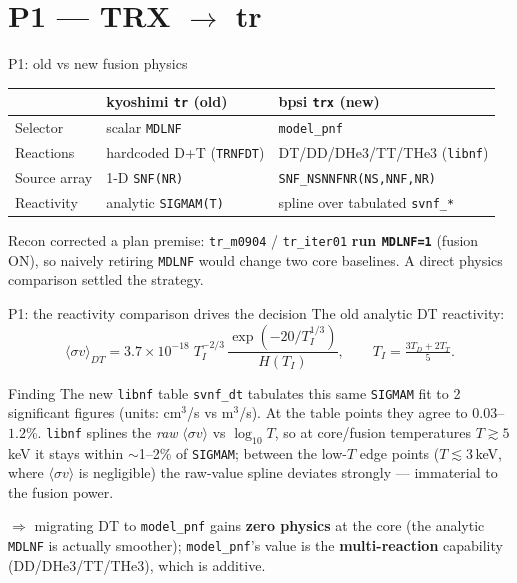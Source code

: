\documentclass[10pt,aspectratio=169]{beamer}
\newcommand{\C}[1]{\texttt{\small #1}}          %
\begin{document}
\section{P1 --- TRX $\to$ tr}
\begin{frame}{P1: old vs new fusion physics}
\begin{table}\footnotesize
\begin{tabular}{@{}lll@{}}
\toprule
 & kyoshimi \C{tr} (old) & bpsi \C{trx} (new) \\
\midrule
Selector    & scalar \C{MDLNF} & \C{model\_pnf} \\
Reactions   & hardcoded D+T (\C{TRNFDT}) & DT/DD/DHe3/TT/THe3 (\C{libnf}) \\
Source array& 1-D \C{SNF(NR)} & \C{SNF\_NSNNFNR(NS,NNF,NR)} \\
Reactivity  & analytic \C{SIGMAM(T)} & spline over tabulated \C{svnf\_*} \\
\bottomrule
\end{tabular}
\end{table}
\medskip
Recon corrected a plan premise: \C{tr\_m0904} / \C{tr\_iter01} \textbf{run \C{MDLNF=1}} (fusion ON),
so naively retiring \C{MDLNF} would change two core baselines. A direct physics comparison settled
the strategy.
\end{frame}

\begin{frame}{P1: the reactivity comparison drives the decision}
The old analytic DT reactivity:
\[
\langle\sigma v\rangle_{DT}=3.7\times10^{-18}\;T_I^{-2/3}\,
\frac{\exp\!\left(-20/T_I^{1/3}\right)}{H(T_I)},\qquad
T_I=\tfrac{3T_D+2T_T}{5}.
\]
\begin{block}{Finding}
The new \C{libnf} table \C{svnf\_dt} tabulates this same \C{SIGMAM} fit to 2 significant figures
(units: cm$^3$/s vs m$^3$/s). At the table points they agree to $0.03$--$1.2\%$. \C{libnf} splines the
\emph{raw} $\langle\sigma v\rangle$ vs $\log_{10}T$, so at core/fusion temperatures $T\gtrsim5$\,keV it
stays within $\sim$1--2\% of \C{SIGMAM}; between the low-$T$ edge points ($T\lesssim3$\,keV, where $\langle\sigma v\rangle$
is negligible) the raw-value spline deviates strongly --- immaterial to the fusion power.
\end{block}
$\Rightarrow$ migrating DT to \C{model\_pnf} gains \textbf{zero physics} at the core (the analytic
\C{MDLNF} is actually smoother); \C{model\_pnf}'s value is the \textbf{multi-reaction} capability
(DD/DHe3/TT/THe3), which is additive.
\end{frame}
\end{document}
